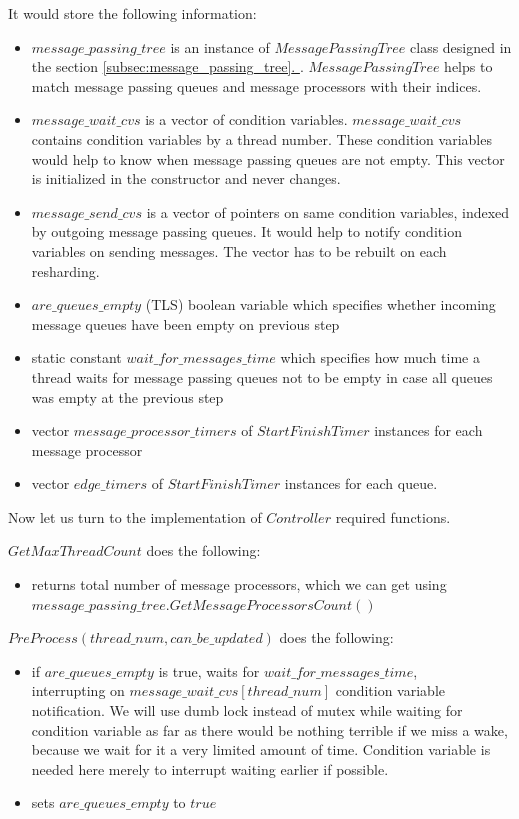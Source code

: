 \documentclass{article}
\newcommand*{\fullref}[1]{\hyperref[{#1}]{\ref*{#1}. \nameref*{#1}}}
\begin{document}
It would store the following information:
\begin{itemize}
	\item $message\_passing\_tree$ is an instance of $MessagePassingTree$ class designed in the section \fullref{subsec:message_passing_tree}. $MessagePassingTree$ helps to match message passing queues and message processors with their indices.
	\item $message\_wait\_cvs$ is a vector of condition variables. $message\_wait\_cvs$ contains condition variables by a thread number. These condition variables would help to know when message passing queues are not empty. This vector is initialized in the constructor and never changes.
	\item $message\_send\_cvs$ is a vector of pointers on same condition variables, indexed by outgoing message passing queues. It would help to notify condition variables on sending messages. The vector has to be rebuilt on each resharding.
	\item $are\_queues\_empty$ (TLS) boolean variable which specifies whether incoming message queues have been empty on previous step
	\item static constant $wait\_for\_messages\_time$ which specifies how much time a thread waits for message passing queues not to be empty in case all queues was empty at the previous step
	\item vector $message\_processor\_timers$ of $StartFinishTimer$ instances for each message processor
	\item vector $edge\_timers$ of $StartFinishTimer$ instances for each queue.
\end{itemize}

Now let us turn to the implementation of $Controller$ required functions.

$GetMaxThreadCount$ does the following:
\begin{itemize}
	\item returns total number of message processors, which we can get using\\
		$message\_passing\_tree.GetMessageProcessorsCount()$
\end{itemize}

$PreProcess(thread\_num, can\_be\_updated)$ does the following:
\begin{itemize}
	\item if $are\_queues\_empty$ is true, waits for $wait\_for\_messages\_time$,\\
		interrupting on $message\_wait\_cvs[thread\_num]$ condition variable notification. We will use dumb lock instead of mutex while waiting for condition variable as far as there would be nothing terrible if we miss a wake, because we wait for it a very limited amount of time. Condition variable is needed here merely to interrupt waiting earlier if possible.
	\item sets $are\_queues\_empty$ to $true$
\end{itemize}
\end{document}
